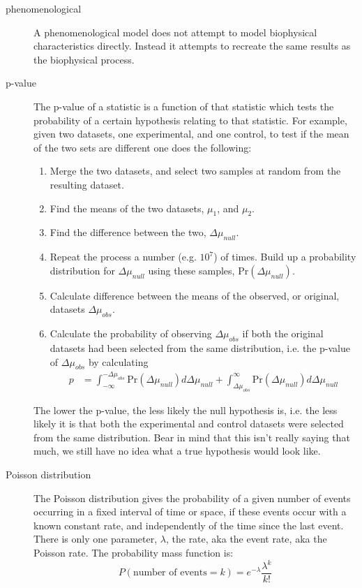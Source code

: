\documentclass[a4paper,12pt]{article}
\theoremstyle{definition}
\begin{document}
\begin{description}
  \item[phenomenological] A phenomenological model does not attempt to model biophysical characteristics directly. Instead it attempts to recreate the same results as the biophysical process.

  \item[p-value] The p-value of a statistic is a function of that statistic which tests the probability of a certain hypothesis relating to that statistic. For example, given two datasets, one experimental, and one control, to test if the mean of the two sets are different one does the following:
   \begin{enumerate}
    \item Merge the two datasets, and select two samples at random from the resulting dataset.
    \item Find the means of the two datasets, $\mu_1$, and $\mu_2$.
    \item Find the difference between the two, $\Delta \mu_{null}$.
    \item Repeat the process a number (e.g. $10^7$) of times. Build up a probability distribution for $\Delta \mu_{null}$ using these samples, Pr$(\Delta \mu_{null})$.
    \item Calculate difference between the means of the observed, or original, datasets $\Delta \mu_{obs}$.
    \item Calculate the probability of observing $\Delta \mu_{obs}$ if both the original datasets had been selected from the same distribution, i.e. the p-value of $\Delta \mu_{obs}$ by calculating
     \begin{align}
      p &= \int_{-\infty}^{-\Delta \mu_{obs}} \text{Pr}(\Delta \mu_{null}) d \Delta \mu_{null} +  \int^{\infty}_{\Delta \mu_{obs}} \text{Pr}(\Delta \mu_{null}) d \Delta \mu_{null}
     \end{align}
   \end{enumerate}
   The lower the p-value, the less likely the null hypothesis is, i.e. the less likely it is that both the experimental and control datasets were selected from the same distribution. Bear in mind that this isn't really saying that much, we still have no idea what a true hypothesis would look like.

  \item[Poisson distribution] The Poisson distribution gives the probability of a given number of events occurring in a fixed interval of time or space, if these events occur with a known constant rate, and independently of the time since the last event. There is only one parameter, $\lambda$, the rate, aka the event rate, aka the Poisson rate. The probability mass function is:
  \begin{equation}
    P(\text{number of events} = k) = e^{-\lambda} \frac{\lambda^k}{k!}
  \end{equation}


\end{description}
\end{document}
